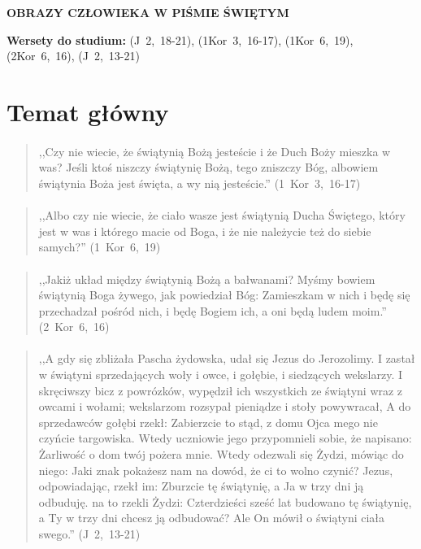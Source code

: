 \documentclass[10pt,a4paper,oneside]{article}
\begin{document}
\centerline{\textbf{\MakeUppercase{Obrazy człowieka w Piśmie Świętym}}}
\begin{center}
\textbf{Wersety do studium:} \mbox{(J 2, 18-21)}, \mbox{(1Kor 3, 16-17)}, \mbox{(1Kor 6, 19)}, \mbox{(2Kor 6, 16)}, \mbox{(J 2, 13-21)}
\end{center}
\section{Temat główny}
\paragraph{}
\begin{quote}
,,Czy nie wiecie, że świątynią Bożą jesteście i że Duch Boży mieszka w was? Jeśli ktoś niszczy świątynię Bożą, tego zniszczy Bóg, albowiem świątynia Boża jest święta, a wy nią jesteście.'' \mbox{(1 Kor 3, 16-17)}
\end{quote}
\paragraph{}
\begin{quote}
,,Albo czy nie wiecie, że ciało wasze jest świątynią Ducha Świętego, który jest w was i którego macie od Boga, i że nie należycie też do siebie samych?'' \mbox{(1 Kor 6, 19)}
\end{quote}
\paragraph{}
\begin{quote}
,,Jakiż układ między świątynią Bożą a bałwanami? Myśmy bowiem świątynią Boga żywego, jak powiedział Bóg: Zamieszkam w nich i będę się przechadzał pośród nich, i będę Bogiem ich, a oni będą ludem moim.'' \mbox{(2 Kor 6, 16)}
\end{quote}
\paragraph{}
\begin{quote}
,,A gdy się zbliżała Pascha żydowska, udał się Jezus do Jerozolimy. I zastał w świątyni sprzedających woły i owce, i gołębie, i siedzących wekslarzy. I skręciwszy bicz z powrózków, wypędził ich wszystkich ze świątyni wraz z owcami i wołami; wekslarzom rozsypał pieniądze i stoły powywracał, A do sprzedawców gołębi rzekł: Zabierzcie to stąd, z domu Ojca mego nie czyńcie targowiska. Wtedy uczniowie jego przypomnieli sobie, że napisano: Żarliwość o dom twój pożera mnie. Wtedy odezwali się Żydzi, mówiąc do niego: Jaki znak pokażesz nam na dowód, że ci to wolno czynić? Jezus, odpowiadając, rzekł im: Zburzcie tę świątynię, a Ja w trzy dni ją odbuduję. na to rzekli Żydzi: Czterdzieści sześć lat budowano tę świątynię, a Ty w trzy dni chcesz ją odbudować? Ale On mówił o świątyni ciała swego.'' \mbox{(J 2, 13-21)}
\end{quote}
\end{document}

